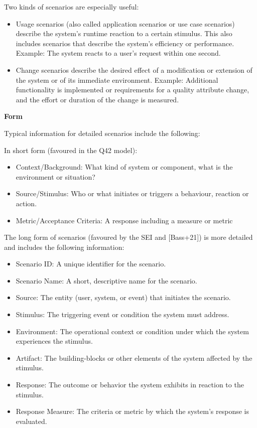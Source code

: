 \documentclass[12pt,a4paper]{article}
\newcommand{\minititle}[1]{%
  \par\addvspace{0.6\baselineskip}%
  \noindent\textbf{#1}\par\nobreak%
  \noindent\ignorespaces%
}
\begin{document}
Two kinds of scenarios are especially useful:
\begin{itemize}
  \item Usage scenarios (also called application scenarios or use case scenarios) describe the system’s runtime reaction to a certain stimulus. This also includes scenarios that describe the system’s efficiency or performance. Example: The system reacts to a user’s request within one second.
  \item Change scenarios describe the desired effect of a modification or extension of the system or of its immediate environment. Example: Additional functionality is implemented or requirements for a quality attribute change, and the effort or duration of the change is measured.
\end{itemize}

\minititle{Form}
Typical information for detailed scenarios include the following:

In short form (favoured in the Q42 model):
\begin{itemize}
  \item Context/Background: What kind of system or component, what is the environment or situation?
  \item Source/Stimulus: Who or what initiates or triggers a behaviour, reaction or action.
  \item Metric/Acceptance Criteria: A response including a measure or metric
\end{itemize}

The long form of scenarios (favoured by the SEI and [Bass+21]) is more detailed and includes the following information:
\begin{itemize}
  \item Scenario ID: A unique identifier for the scenario.
  \item Scenario Name: A short, descriptive name for the scenario.
  \item Source: The entity (user, system, or event) that initiates the scenario.
  \item Stimulus: The triggering event or condition the system must address.
  \item Environment: The operational context or condition under which the system experiences the stimulus.
  \item Artifact: The building-blocks or other elements of the system affected by the stimulus.
  \item Response: The outcome or behavior the system exhibits in reaction to the stimulus.
  \item Response Measure: The criteria or metric by which the system’s response is evaluated.
\end{itemize}
\end{document}
